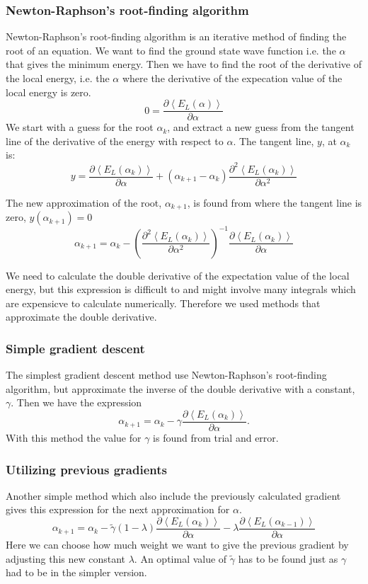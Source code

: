 \subsubsection{Newton-Raphson's root-finding algorithm}
Newton-Raphson's root-finding algorithm is an iterative method of finding the root of an equation. We want to find the ground state wave function i.e. the $\alpha$ that gives the minimum energy. Then we have to find the root of the derivative of the local energy, i.e. the $\alpha$ where the derivative of the expecation value of the local energy is zero.
$$ 0 = \frac{\partial \left<E_L(\alpha)\right>}{\partial \alpha}$$
We start with a guess for the root $\alpha_k$, and extract a new guess from the tangent line of the derivative of the energy with respect to $\alpha$. The tangent line, $y$, at $\alpha_k$ is:
$$y = \frac{\partial \left<E_L(\alpha_k)\right>}{\partial \alpha} + (\alpha_{k+1} - \alpha_k) \frac{\partial^2 \left<E_L(\alpha_k)\right>}{\partial \alpha^2}$$

The new approximation of the root, $\alpha_{k+1}$, is found from where the tangent line is zero, $y(\alpha_{k+1})=0$
$$ \alpha_{k+1} =  \alpha_k - \left(\frac{\partial^2 \left<E_L(\alpha_k)\right>}{\partial \alpha^2}\right)^{-1}\frac{\partial \left<E_L(\alpha_k)\right>}{\partial \alpha} $$

We need to calculate the double derivative of the expectation value of the local energy, but this expression is difficult to and might involve many integrals which are expensicve to calculate numerically. Therefore we used methods that approximate the double derivative. 

\subsubsection{Simple gradient descent}\label{sec:gradient}
The simplest gradient descent method use Newton-Raphson's root-finding algorithm, but approximate the inverse of the double derivative with a constant, $\gamma$. Then we have the expression
$$ \alpha_{k+1} =  \alpha_k - \gamma \frac{\partial \left<E_L(\alpha_k)\right>}{\partial \alpha}. $$
With this method the value for $\gamma$ is found from trial and error.

\subsubsection{Utilizing previous gradients}\label{sec:gradient2}

Another simple method which also include the previously calculated gradient gives this expression for the next approximation for $\alpha$.
$$  \alpha_{k+1} =  \alpha_k - \tilde{\gamma} (1-\lambda) \frac{\partial \left<E_L(\alpha_k)\right>}{\partial \alpha} - \lambda \frac{\partial \left<E_L(\alpha_{k-1})\right>}{\partial \alpha}  $$
Here we can choose how much weight we want to give the previous gradient by adjusting this new constant $\lambda$. An optimal value of $\tilde{\gamma}$ has to be found just as $\gamma$ had to be in the simpler version.

